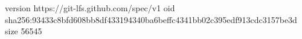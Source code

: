 version https://git-lfs.github.com/spec/v1
oid sha256:93433c8bfd608bb8df433194340ba6beffc4341bb02c395edf913cdc3157be3d
size 56545
